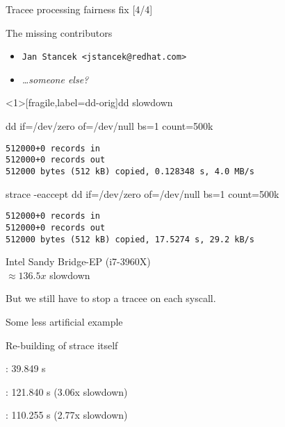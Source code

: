 \documentclass[unicode]{beamer}
\begin{document}
\begin{frame}[fragile]{Tracee processing fairness fix \hfill [4/4]}
\begin{block}{\large The missing contributors}
\begin{itemize}
  \item \texttt{Jan Stancek <jstancek@redhat.com>}
  \item \textit{…someone else?}
\end{itemize}
\end{block}
\end{frame}


\begin{frame}<1>[fragile,label=dd-orig]{dd slowdown}
\begin{block}{\large dd if=/dev/zero of=/dev/null bs=1 count=500k}
\begin{verbatim}
512000+0 records in
512000+0 records out
512000 bytes (512 kB) copied, 0.128348 s, 4.0 MB/s
\end{verbatim}
\end{block}

\begin{block}{\large strace -eaccept dd if=/dev/zero of=/dev/null bs=1 count=500k}
\begin{verbatim}
512000+0 records in
512000+0 records out
512000 bytes (512 kB) copied, 17.5274 s, 29.2 kB/s
\end{verbatim}
\end{block}
\begin{scriptsize}
Intel Sandy Bridge-EP (i7-3960X) \\
$\approx 136.5x$ slowdown \\
\end{scriptsize}
\pause
But we still have to stop a tracee on each syscall.
\end{frame}

\begin{frame}[fragile]{Some less artificial example\footnotemark[1]}
\begin{block}{\large Re-building of strace itself}
\begin{description}[labelindent=10cm,labelwidth=9cm]
  \item[Non-traced run]: 39.849 s
  \item[Under strace 4.6]: 121.840 s (3.06x slowdown)
  \item[Under strace 5.4]: 110.255 s (2.77x slowdown)
\end{description}
\end{block}
\end{frame}
\end{document}
